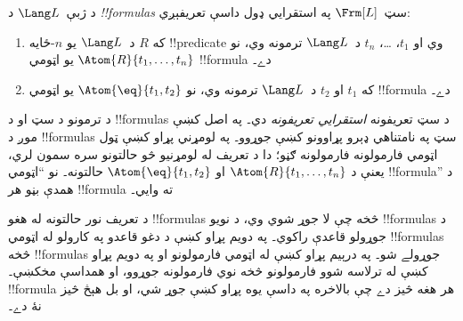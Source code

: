 \documentclass[../../../include/open-logic-section]{subfiles}
\begin{document}
\begin{defn}[فارمولونه]
د ژبې~$\Lang L$ د \emph{!!{formula}s} سټ~$\Frm[L]$ په استقرايي
ډول داسې تعريفېږي:
\begin{enumerate}


\item که $R$ د~$\Lang L$ يو $n$-ځايه !!{predicate} وي او $t_1$، \dots،
  $t_n$ د~$\Lang L$ ترمونه وي، نو $\Atom{R}{t_1,\ldots, t_n}$ يو
  اټومي !!{formula} دے۔

\item که $t_1$ او $t_2$ د~$\Lang L$ ترمونه وي، نو
  $\Atom{\eq}{t_1, t_2}$ يو اټومي !!{formula} دے۔








\end{enumerate}
\end{defn}

\begin{explain}
د ترمونو د سټ او د !!{formula}s د سټ تعريفونه \emph{استقرايي
تعريفونه} دي۔ په اصل کښې موږ د !!{formula}s سټ په نامتناهي ډېرو
پړاوونو کښې جوړوو۔ په لومړني پړاو کښې ټول اټومي فارمولونه فارمولونه
ګڼو؛ دا د تعريف له لومړنيو څو حالتونو سره سمون لري، يعنې د
%
%
$\Atom{R}{t_1,\dots,t_n}$ او $\Atom{\eq}{t_1,t_2}$ حالتونه۔ نو
``اټومي !!{formula}'' د همدې بڼو هر !!{formula} ته وايي۔

د تعريف نور حالتونه له هغو !!{formula}s څخه چې لا جوړ شوي وي، د نويو
!!{formula}s د جوړولو قاعدې راکوي۔ په دويم پړاو کښې د دغو قاعدو په
کارولو له اټومي !!{formula}s څخه !!{formula}s جوړولے شو۔ په درېيم
پړاو کښې له اټومي فارمولونو او په دويم پړاو کښې له ترلاسه شوو فارمولونو
څخه نوي فارمولونه جوړوو، او همداسې مخکښې۔ !!{formula} هر هغه څيز
دے چې بالاخره په داسې يوه پړاو کښې جوړ شي، او بل هېڅ څيز نۀ دے۔
\end{explain}
\end{document}
